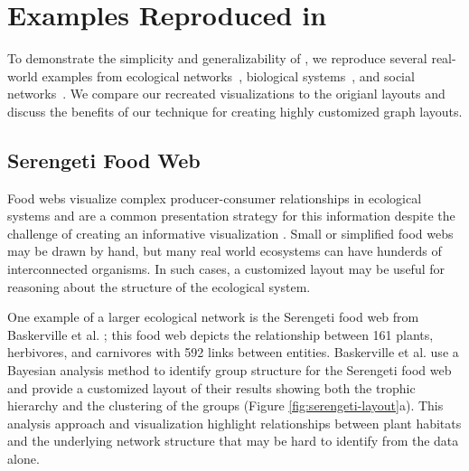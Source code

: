 \section{Examples Reproduced in \projectname}
\label{sec:examples}
To demonstrate the simplicity and generalizability of \projectname, we reproduce several real-world examples from ecological networks~\cite{baskerville2011spatial}, biological systems~\cite{barsky2008cerebral}, and social networks~\cite{rothenberg1998using}. We compare our recreated visualizations to the origianl layouts and discuss the benefits of our technique for creating highly customized graph layouts.





\subsection{Serengeti Food Web}
\serengetiLayout
\serengetiSpec
Food webs visualize complex producer-consumer relationships in ecological systems and are a common presentation strategy for this information \cite{hinke2004visualizing,harper2006dynamic,lavigne1996cod,baskerville2011spatial,yodzis1998local,cohen2003ecological,benson2016higher} despite the challenge of creating an informative visualization \cite{kearney2016blog}. Small or simplified food webs may be drawn by hand, but many real world ecosystems can have hunderds of interconnected organisms. In such cases, a customized layout may be useful for reasoning about the structure of the ecological system.

One example of a larger ecological network is the Serengeti food web from Baskerville et al. \cite{baskerville2011spatial}; this food web depicts the relationship between 161 plants, herbivores, and carnivores with 592 links between entities. Baskerville et al. use a Bayesian analysis method to identify group structure for the Serengeti food web and provide a customized layout of their results showing both the trophic hierarchy and the clustering of the groups (Figure \ref{fig:serengeti-layout}a). This analysis approach and visualization highlight relationships between plant habitats and the underlying network structure that may be hard to identify from the data alone.

